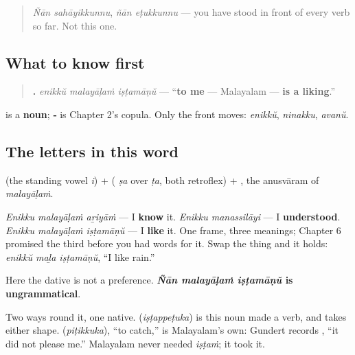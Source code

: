 \label{lesson:ML-C34-ishtam}



\begin{quote}
\emph{Ñān sahāyikkunnu}, \emph{ñān eṭukkunnu} — you have stood in front of every verb so far. Not this one.
\end{quote}

\subsection*{What to know first}
\begin{quote}
\textbf{  .} \emph{enikkŭ malayāḷaṁ iṣṭamāṇŭ} — \textquotedblleft{}\textbf{to me} — Malayalam — \textbf{is a liking}.\textquotedblright{}
\end{quote}

\textbf{} is a \textbf{noun}; \textbf{‑} is Chapter 2's copula. Only the front moves: \emph{enikkŭ}, \emph{ninakku}, \emph{avanŭ}.

\subsection*{The letters in this word}
\textbf{} (the standing vowel \emph{i}) + \textbf{} (\textbf{} \emph{ṣa} over \textbf{} \emph{ṭa}, both retroflex) + \textbf{}, the anusvāram of \emph{malayāḷaṁ}.

\begin{grammarlens}[title={Grammar Lens: three sentences on one frame}]
\emph{Enikku malayāḷaṁ aṟiyāṁ} — I \textbf{know} it. \emph{Enikku manassilāyi} — I \textbf{understood}. \emph{Enikku malayāḷaṁ iṣṭamāṇŭ} — I \textbf{like} it. One frame, three meanings; Chapter 6 promised the third before you had words for it. Swap the thing and it holds: \emph{enikkŭ maḻa iṣṭamāṇŭ}, \textquotedblleft{}I like rain.\textquotedblright{}

Here the dative is not a preference. \textbf{\emph{Ñān malayāḷaṁ iṣṭamāṇŭ} is ungrammatical}.

Two ways round it, one native. \textbf{} (\emph{iṣṭappeṭuka}) is this noun made a verb, and takes either shape. \textbf{} (\emph{piṭikkuka}), \textquotedblleft{}to catch,\textquotedblright{} is Malayalam's own: Gundert records \textbf{ }, \textquotedblleft{}it did not please me.\textquotedblright{} Malayalam never needed \emph{iṣṭaṁ}; it took it.
\end{grammarlens}

